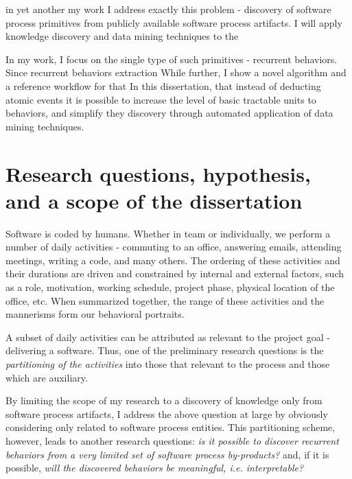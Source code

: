 in yet
another my work I address exactly this problem - discovery of software process primitives from publicly available 
software process artifacts. I will apply knowledge discovery and data mining techniques to the

In my work, I focus on the single type of such primitives - recurrent behaviors. 
Since recurrent behaviors extraction While further, I show a novel algorithm and a reference workflow for that In this dissertation, that instead of deducting atomic events it is
possible to increase the level of basic tractable units to behaviors, and simplify they discovery through automated
application of data mining techniques.

\section{Research questions, hypothesis, and a scope of the dissertation}\label{section_hypothesis}
Software is coded by humans. Whether in team or individually, we perform a number of daily activities - 
commuting to an office, answering emails, attending meetings, writing a code, and many others. 
The ordering of these activities and their durations are driven and constrained by internal and external factors, 
such as a role, motivation, working schedule, project phase, physical location of the office, etc. 
When summarized together, the range of these activities and the mannerisms form our behavioral portraits.

A subset of daily activities can be attributed as relevant to the project goal - delivering a software. 
Thus, one of the preliminary research questions is the \textit{partitioning of the activities} into those that 
relevant to the process and those which are auxiliary. 


By limiting the scope of my research to a discovery of knowledge only from software process artifacts, 
I address the above question at large by obviously considering only related to software process entities.
This partitioning scheme, however, leads to another research questions: \textit{is it possible to discover 
recurrent behaviors from a very limited set of software process by-products?} and, if it is possible, 
\textit{will the discovered behaviors be meaningful, i.e. interpretable?}

